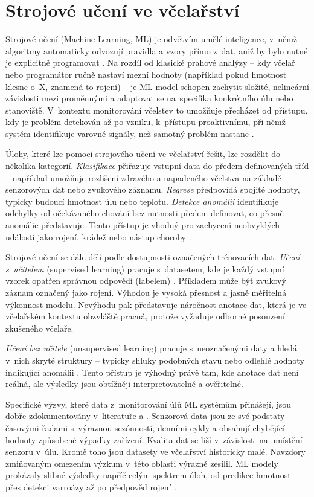 \section{Strojové učení ve včelařství}
Strojové učení (Machine Learning, ML) je odvětvím umělé inteligence, v~němž algoritmy automaticky odvozují pravidla a vzory přímo z~dat, aniž by bylo nutné je explicitně programovat \cite{ML-IBM}. Na rozdíl od klasické prahové analýzy -- kdy včelař nebo programátor ručně nastaví mezní hodnoty (například pokud hmotnost klesne o~X, znamená to rojení) -- je ML model schopen zachytit složité, nelineární závislosti mezi proměnnými a adaptovat se na~specifika konkrétního úlu nebo stanoviště. V~kontextu monitorování včelstev to umožňuje přecházet od přístupu, kdy je problém detekován až po vzniku, k~přístupu proaktivnímu, při němž systém identifikuje varovné signály, než samotný problém nastane \cite{Sabic2025}.

Úlohy, které lze pomocí strojového učení ve včelařství řešit, lze rozdělit do několika kategorií. \textit{Klasifikace} přiřazuje vstupní data do předem definovaných tříd -- například umožňuje rozlišení zdravého a napadeného včelstva na základě senzorových dat nebo zvukového záznamu. \textit{Regrese} předpovídá spojité hodnoty, typicky budoucí hmotnost úlu nebo teplotu. \textit{Detekce anomálií} identifikuje odchylky od očekávaného chování bez nutnosti předem definovat, co přesně anomálie představuje. Tento přístup je vhodný pro zachycení neobvyklých událostí jako rojení, krádež nebo nástup choroby \cite{Sabic2025}.

Strojové učení se dále dělí podle dostupnosti označených trénovacích dat. \textit{Učení s~učitelem} (supervised learning) pracuje s~datasetem, kde je každý vstupní vzorek opatřen správnou odpovědí (labelem) \cite{ML-IBM}. Příkladem může být zvukový záznam označený jako rojení. Výhodou je vysoká přesnost a jasně měřitelná výkonnost modelu. Nevýhodu pak představuje náročnost anotace dat, která je ve včelařském kontextu obzvláště pracná, protože vyžaduje odborné posouzení zkušeného včelaře.

\textit{Učení bez učitele} (unsupervised learning) pracuje s~neoznačenými daty a hledá v~nich skryté struktury -- typicky shluky podobných stavů nebo odlehlé hodnoty indikující anomálii \cite{ML-IBM}. Tento přístup je výhodný právě tam, kde anotace dat není reálná, ale výsledky jsou obtížněji interpretovatelné a ověřitelné.

Specifické výzvy, které data z~monitorování úlů ML systémům přinášejí, jsou dobře zdokumentovány v~literatuře \cite{Sabic2025} a \cite{Turyagyenda2025}. Senzorová data jsou ze své podstaty časovými řadami s~výraznou sezónností, denními cykly a obsahují chybějící hodnoty způsobené výpadky zařízení. Kvalita dat se liší v~závislosti na umístění senzoru v~úlu. Kromě toho jsou datasety ve včelařství historicky malé. Navzdory zmiňovaným omezením výzkum v~této oblasti výrazně zesílil. ML modely prokázaly slibné výsledky napříč celým spektrem úloh, od predikce hmotnosti přes detekci varroázy až po předpověď rojení \cite{Sabic2025}.

